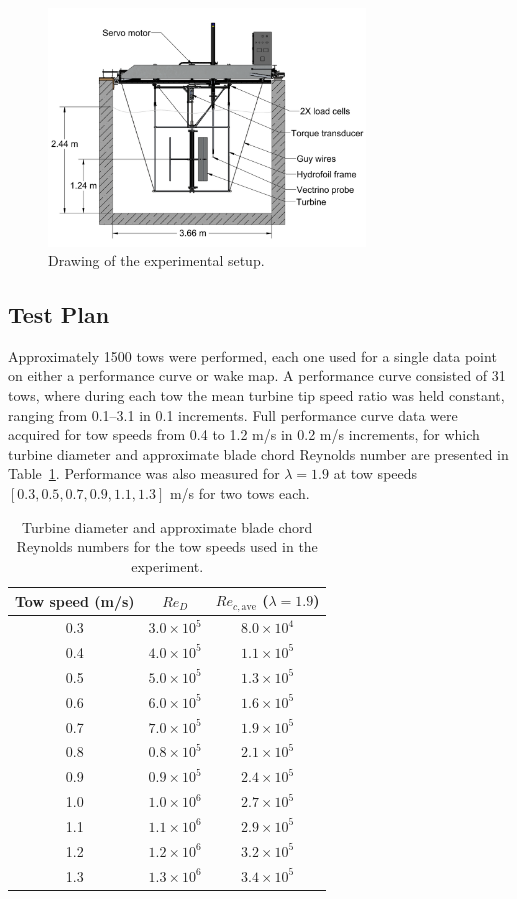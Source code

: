 \documentclass[energies,article,accept,moreauthors,pdftex,12pt,a4paper]{mdpi}
\begin{document}
\begin{figure}[ht!]
\centering
\includegraphics[width=0.75\textwidth]{figures/exp_setup_drawing}
\caption{Drawing of the experimental setup.}
\label{fig:exp-setup}
\end{figure}


\subsection{Test Plan} 

Approximately 1500 tows were performed, each one used for a single data point on
either a performance curve or wake map. A performance curve consisted of 31
tows, where during each tow the mean turbine tip speed ratio was held constant,
ranging from 0.1--3.1 in 0.1 increments. Full performance curve data were
acquired for tow speeds from 0.4 to 1.2 m/s in 0.2 m/s increments, for which
turbine diameter and approximate blade chord Reynolds number are presented in
Table~\ref{tab:Re}. Performance was also measured for $\lambda=1.9$ at tow
speeds $[0.3, 0.5, 0.7, 0.9, 1.1, 1.3]$ m/s for two tows each.

\begin{table}
\centering
\begin{tabular}{ccc}
Tow speed (m/s) & $Re_D$ & $Re_{c,\mathrm{ave}}$ ($\lambda = 1.9$) \\ 
\hline
0.3 & $3.0 \times 10^5$ & $8.0 \times 10^4$ \\ 
0.4 & $4.0 \times 10^5$ & $1.1 \times 10^5$ \\ 
0.5 & $5.0 \times 10^5$ & $1.3 \times 10^5$ \\ 
0.6 & $6.0 \times 10^5$ & $1.6 \times 10^5$ \\ 
0.7 & $7.0 \times 10^5$ & $1.9 \times 10^5$ \\ 
0.8 & $0.8 \times 10^5$ & $2.1 \times 10^5$ \\ 
0.9 & $0.9 \times 10^5$ & $2.4 \times 10^5$ \\ 
1.0 & $1.0 \times 10^6$ & $2.7 \times 10^5$ \\ 
1.1 & $1.1 \times 10^6$ & $2.9 \times 10^5$ \\ 
1.2 & $1.2 \times 10^6$ & $3.2 \times 10^5$ \\ 
1.3 & $1.3 \times 10^6$ & $3.4 \times 10^5$ \\ 
\end{tabular} 
\caption{Turbine diameter and approximate blade chord Reynolds numbers for the
tow speeds used in the experiment.}
\label{tab:Re}
\end{table}
\end{document}
